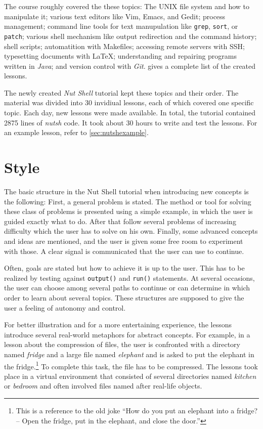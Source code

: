 \documentclass[paper=a4,twoside,abstract=on,cleardoublepage=empty,numbers=noenddot,toc=bib,12pt,appendixprefix=true]{scrreprt}
\begin{document}
The course roughly covered the these topics: The \textsc{UNIX} file system and how to manipulate it; various text editors like Vim, Emacs, and Gedit; process management; command line tools for text manupulation like \texttt{grep}, \texttt{sort}, or \texttt{patch}; various shell mechanism like output redirection and the command history; shell scripts; automatition with Makefiles; accessing remote servers with \textsc{SSH}; typesetting documents with \LaTeX; understanding and repairing programs written in \textit{Java}; and version control with \textit{Git}.  gives a complete list of the created lessons.

The newly created \textit{Nut Shell} tutorial kept these topics and their order. The material was divided into 30 invidiual lessons, each of which covered one specific topic. Each day, new lessons were made available. In total, the tutorial contained 2875 lines of \textit{nutsh} code. It took about 30 hours to write and test the lessons. For an example lesson, refer to \cref{sec:nutshexample}.

\section{Style}

The basic structure in the Nut Shell tutorial when introducing new concepts is the following: First, a general problem is stated. The method or tool for solving these class of problems is presented using a simple example, in which the user is guided exactly what to do. After that follow several problems of increasing difficulty which the user has to solve on his own. Finally, some advanced concepts and ideas are mentioned, and the user is given some free room to experiment with those. A clear signal is communicated that the user can use to continue.

Often, goals are stated but how to achieve it is up to the user. This has to be realized by testing against \texttt{output()} and \texttt{run()} statements. At several occasions, the user can choose among several paths to continue or can determine in which order to learn about several topics. These structures are supposed to give the user a feeling of autonomy and control.

For better illustration and for a more entertaining experience, the lessons introduce several real-world metaphors for abstract concepts. For example, in a lesson about the compression of files, the user is confronted with a directory named \textit{fridge} and a large file named \textit{elephant} and is asked to put the elephant in the fridge.\footnote{This is a reference to the old joke “How do you put an elephant into a fridge? -- Open the fridge, put in the elephant, and close the door.”} To complete this task, the file has to be compressed. The lessons took place in a virtual environment that consisted of several directories named \emph{kitchen} or \emph{bedroom} and often involved files named after real-life objects.
\end{document}
